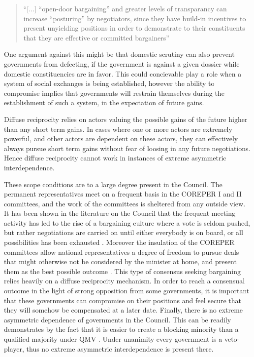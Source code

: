 \begin{quote}
  ``[...] ``open-door bargaining'' and greater levels of transparancy can increase ``posturing'' by negotiators, since they have build-in incentives to present unyielding positions in order to demonstrate to their constituents that they are effective or committed bargainers''
\end{quote}

One argument against this might be that domestic scrutiny can also prevent governments from defecting, if the government is against a given dossier while domestic constituencies are in favor. This could concievable play a role when a system of social exchanges is being established, however the ability to compromise implies that governments will restrain themselves during the establishment of such a system, in the expectation of future gains. 

Diffuse reciprocity relies on actors valuing the possible gains of the future higher than any short term gains. In cases where one or more actors are extremely powerful, and other actors are dependent on these actors, they can effectively always pursue short term gains without fear of loosing in any future negotiations. Hence diffuse reciprocity cannot work in instances of extreme asymmetric interdependence. 

These scope conditions are to a large degree present in the Council. The permanent representatives meet on a frequent basis in the COREPER I and II committees, and the work of the committees is sheltered from any outside view. It has been shown in the literature on the Council that the frequent meeting activity has led to the rise of a bargaining culture where a vote is seldom pushed, but rather negotiations are carried on until either everybody is on board, or all possibilities has been exhausted \citep{Lewis1998,Lewis2003, BjurulfElgstrom2004}. Moreover the insulation of the COREPER committees allow national representatives  a degree of freedom to pursue deals that might otherwise not be considered by the minister at home, and present them as the best possible outcome \citep[947]{Lewis2005}. This type of consensus seeking bargaining relies heavily on a diffuse reciprocity mechanism. In order to reach a consensual outcome in the light of strong opposition from some governments, it is important that these governments can compromise on their positions and feel secure that they will somehow be compensated at a later date. Finally, there is no extreme asymmetric dependence of governments in the Council. This can be readily demonstrates by the fact that it is easier to create a blocking minority than a qualified majority under QMV \citep{Moberg2002}. Under unanimity every government is a veto-player, thus no extreme asymmetric interdependence is present there.  


